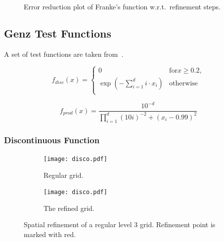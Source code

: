 \begin{figure}[hbtp]
    \centering
    
    \caption{Error reduction plot of Franke's function w.r.t.\ refinement steps.}
    \label{fig:frankeerr}
\end{figure}

\subsection{Genz Test Functions}\label{sec:genzfunc}

A set of test functions are taken from~\cite{Genz1987}.

\begin{equation}
    f_{disc}(x) = \left\{
    \begin{array}{ll}
        0                                             & \text{for} x \ge 0.2 , \\
        \exp\left(- \sum_{i=1}^{d} i \cdot x_i\right) & \text{otherwise}       \\
    \end{array}
    \right.
\end{equation}

\begin{equation}
    f_{prod}(x) = \frac{10^{-d}}{\prod_{i=1}^d (10i)^{-2} + \left( x_i -0.99\right)^2}
\end{equation}

\subsubsection{Discontinuous Function}\label{sec:discontinuous}

\begin{figure}[hbtp]
    \centering
    \begin{subfigure}{0.45\textwidth}
        \texttt{[image: disco.pdf]}
        \caption{Regular grid.}
        \label{fig:regularlevel3}
    \end{subfigure}
    \begin{subfigure}{0.45\textwidth}
        \texttt{[image: disco.pdf]}
        \caption{The refined grid.}
    \end{subfigure}
    \caption{Spatial refinement of a regular level 3 grid. Refinement point is marked with red.}
    \label{fig:peaksurface}
\end{figure}

\begin{figure}[hbtp]
    \centering
    
    \caption{}
    \label{fig:discoerr}
\end{figure}

